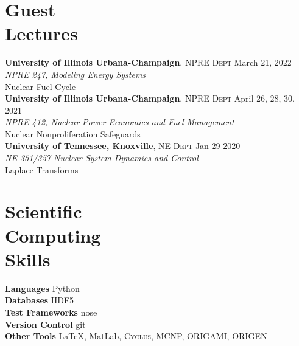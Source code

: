\documentclass[margin,line]{resume}
\newcommand{\Cyclus}{\textsc{Cyclus}\xspace}%
\begin{document}
\begin{resume}
    \section{\mysidestyle Guest\\Lectures}
    \textbf{University of Illinois Urbana-Champaign}, \textsc{NPRE Dept} \hfill March 21, 2022\\
    \textsl{NPRE 247, Modeling Energy Systems} \\
        Nuclear Fuel Cycle\\
    \textbf{University of Illinois Urbana-Champaign}, \textsc{NPRE Dept} \hfill April 26, 28, 30, 2021\\
    \textsl{NPRE 412, Nuclear Power Economics and Fuel Management} \\
        Nuclear Nonproliferation Safeguards\\
    \textbf{University of Tennessee, Knoxville}, \textsc{NE Dept} \hfill Jan 29 2020\\
    \textsl{NE 351/357 Nuclear System Dynamics and Control} \\
        Laplace Transforms\\
    \section{\mysidestyle Scientific\\Computing\\Skills}
                \textbf{Languages} \hfill Python\vspace{.5mm}\\%
                \textbf{Databases} \hfill HDF5\vspace{.5mm}\\%
                \textbf{Test Frameworks} \hfill nose\vspace{.5mm}\\%
                \textbf{Version Control} \hfill git\vspace{.5mm}\\%
                \textbf{Other Tools} \hfill \LaTeX, MatLab, \Cyclus, MCNP, ORIGAMI, ORIGEN\vspace{.5mm}%

\end{resume}
\end{document}
